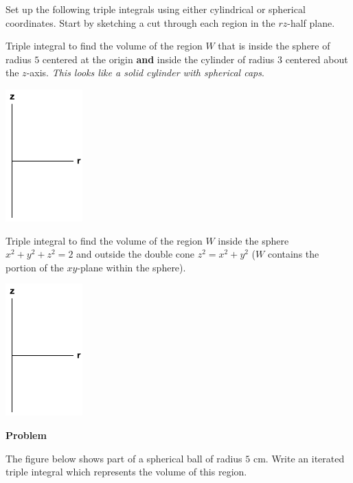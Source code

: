 \documentclass[12pt,letterpaper,noanswers]{exam}
\begin{document}
Set up the following triple integrals using either cylindrical or spherical coordinates.  Start by sketching a cut through each region in the $rz$-half plane.
\begin{parts}
\item Triple integral to find the volume of the region $W$ that is inside the sphere of radius $5$ centered at the origin \textbf{and} inside the cylinder of radius $3$ centered about the $z$-axis.  \emph{This looks like a solid cylinder with spherical caps}.

\includegraphics[height=2in]{img/C13rzaxes.png}

\item Triple integral to find the volume of the region $W$ inside the sphere $x^2+y^2+z^2 = 2$ and outside the double cone $z^2=x^2+y^2$ ($W$ contains the portion of the $xy$-plane within the sphere).

\includegraphics[height=2in]{img/C13rzaxes.png}

\end{parts}

\vfill





\noindent\textbf{Problem}


The figure below shows part of a spherical ball of radius $5$ cm.  Write an iterated triple integral which represents the volume of this region.
\end{document}
